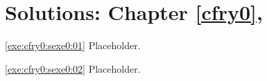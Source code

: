 \chapter[Solutions: Chapter \ref{cfry0}]
        {Solutions: Chapter \ref{cfry0}, \cfryzerolongtitle{}}

\label{cfrs0}

\vworkexercisechapterheader{}
\begin{vworkexercisesolution}{\ref{exe:cfry0:sexe0:01}}
Placeholder.
\end{vworkexercisesolution}
\vworkexerciseseparator
\begin{vworkexercisesolution}{\ref{exe:cfry0:sexe0:02}}
Placeholder.
\end{vworkexercisesolution}
\vworkexercisechapterfooter


